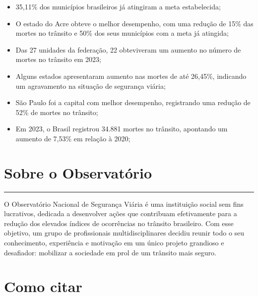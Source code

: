 \documentclass[
  letterpaper,
  DIV=11,
  numbers=noendperiod]{scrreprt}
\providecommand{\tightlist}{%
  \setlength{\itemsep}{0pt}\setlength{\parskip}{0pt}}\usepackage{longtable,booktabs,array}
\begin{document}
\begin{itemize}
\tightlist
\item
  35,11\% dos municípios brasileiros já atingiram a meta estabelecida;
\item
  O estado do Acre obteve o melhor desempenho, com uma redução de 15\%
  das mortes no trânsito e 50\% dos seus municípios com a meta já
  atingida;
\item
  Das 27 unidades da federação, 22 obteviveram um aumento no número de
  mortes no trânsito em 2023;
\item
  Alguns estados apresentaram aumento nas mortes de até 26,45\%,
  indicando um agravamento na situação de segurança viária;
\item
  São Paulo foi a capital com melhor desempenho, registrando uma redução
  de 52\% de mortes no trânsito;
\item
  Em 2023, o Brasil registrou 34.881 mortes no trânsito, apontando um
  aumento de 7,53\% em relação à 2020;
\end{itemize}


\chapter*{Sobre o Observatório}\label{sobre-o-observatuxf3rio}


\begin{center}\rule{0.5\linewidth}{0.5pt}\end{center}

O Observatório Nacional de Segurança Viária é uma instituição social sem
fins lucrativos, dedicada a desenvolver ações que contribuam
efetivamente para a redução dos elevados índices de ocorrências no
trânsito brasileiro. Com esse objetivo, um grupo de profissionais
multidisciplinares decidiu reunir todo o seu conhecimento, experiência e
motivação em um único projeto grandioso e desafiador: mobilizar a
sociedade em prol de um trânsito mais seguro.


\chapter*{Como citar}\label{como-citar}
\end{document}

